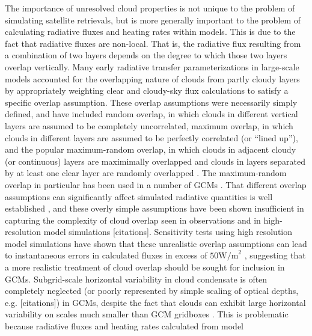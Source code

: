 The importance of unresolved cloud properties is not unique to the
problem of simulating satellite retrievals, but is more generally
important to the problem of calculating radiative fluxes and heating
rates within models. This is due to the fact that radiative fluxes are
non-local. That is, the radiative flux resulting from a combination of
two layers depends on the degree to which those two layers overlap
vertically. Many early radiative transfer parameterizations in
large-scale models accounted for the overlapping nature of clouds from
partly cloudy layers by appropriately weighting clear and cloudy-sky
flux calculations to satisfy a specific overlap assumption. These
overlap assumptions were necessarily simply defined, and have included
random overlap, in which clouds in different vertical layers are assumed
to be completely uncorrelated, maximum overlap, in which clouds in
different layers are assumed to be perfectly correlated (or ``lined
up''), and the popular maximum-random overlap, in which clouds in
adjacent cloudy (or continuous) layers are maximimally overlapped and
clouds in layers separated by at least one clear layer are randomly
overlapped \citep{geleyn_and_hollingsworth_1979, tian_and_curry_1989}.
The maximum-random overlap in particular has been used in a number of
GCMs
\citep[e.g.;][]{collins_et_al_2004, neale_et_al_2010a, neale_et_al_2010b}.
That different overlap assumptions can significantly affect simulated
radiative quantities is well established
\citep[e.g.,][]{morcrette_and_fouquart_1986, stubenrauch_et_al_1997, barker_et_al_1999},
and these overly simple assumptions have been shown insufficient in
capturing the complexity of cloud overlap seen in observations
\citep{hogan_and_illingworth_2000, mace_and_benson-troth_2002, barker_2008}
and in high-resolution model simulations {[}citations{]}. Sensitivity
tests using high resolution model simulations have shown that these
unrealistic overlap assumptions can lead to instantaneous errors in
calculated fluxes in excess of \(50 \textrm{W/m}^2\)
\citep{barker_et_al_1999, wu_and_liang_2005}, suggesting that a more
realistic treatment of cloud overlap should be sought for inclusion in
GCMs. Subgrid-scale horizontal variability in cloud condensate is often
completely neglected (or poorly represented by simple scaling of optical
depths, e.g. {[}citations{]}) in GCMs, despite the fact that clouds can
exhibit large horizontal variability on scales much smaller than GCM
gridboxes \citep[e.g.;][]{stephens_and_platt_1987}. This is problematic
because radiative fluxes and heating rates calculated from model

